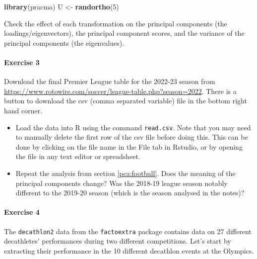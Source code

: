 \documentclass[
]{book}
\newenvironment{Shaded}{\begin{snugshade}}{\end{snugshade}}
\newcommand{\DecValTok}[1]{\textcolor[rgb]{0.00,0.00,0.81}{#1}}
\newcommand{\FunctionTok}[1]{\textcolor[rgb]{0.13,0.29,0.53}{\textbf{#1}}}
\newcommand{\NormalTok}[1]{#1}
\newcommand{\OtherTok}[1]{\textcolor[rgb]{0.56,0.35,0.01}{#1}}
\theoremstyle{definition}
\theoremstyle{definition}
\theoremstyle{definition}
\theoremstyle{definition}
\theoremstyle{remark}
\begin{document}
\begin{Shaded}
\begin{Highlighting}[]
\FunctionTok{library}\NormalTok{(pracma)}
\NormalTok{U }\OtherTok{\textless{}{-}} \FunctionTok{randortho}\NormalTok{(}\DecValTok{5}\NormalTok{)}
\end{Highlighting}
\end{Shaded}

Check the effect of each transformation on the principal components (the loadings/eigenvectors), the principal component scores, and the variance of the principal components (the eigenvalues).

\hypertarget{exercise-3}{%
\paragraph*{Exercise 3}\label{exercise-3}}

Download the final Premier League table for the 2022-23 season from
\url{https://www.rotowire.com/soccer/league-table.php?season=2022}. There is a button to download the csv (comma separated variable) file in the bottom right hand corner.

\begin{itemize}
\item
  Load the data into R using the command \texttt{read.csv}. Note that you may need to manually delete the first row of the csv file before doing this. This can be done by clicking on the file name in the File tab in Rstudio, or by opening the file in any text editor or spreadsheet.
\item
  Repeat the analysis from section \ref{pca:football}. Does the meaning of the principal components change? Was the 2018-19 league season notably different to the 2019-20 season (which is the season analysed in the notes)?
\end{itemize}

\hypertarget{exercise-4}{%
\paragraph*{Exercise 4}\label{exercise-4}}

The \texttt{decathlon2} data from the \texttt{factoextra} package contains
data on 27 different decathletes' performances during two different competitions. Let's start by extracting their performance in the 10 different decathlon events at the Olympics.
\end{document}
